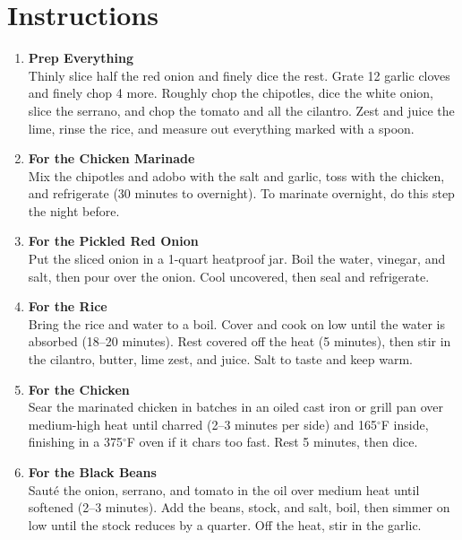 \newpage

\section*{Instructions}

\begin{enumerate}

    \item \textbf{Prep Everything} \\
          Thinly slice half the red onion and finely dice the rest. Grate 12 garlic cloves and finely chop 4 more. Roughly chop the chipotles, dice the white onion, slice the serrano, and chop the tomato and all the cilantro. Zest and juice the lime, rinse the rice, and measure out everything marked with a spoon.

    \item \textbf{For the Chicken Marinade} \\
          Mix the chipotles and adobo with the salt and garlic, toss with the chicken, and refrigerate (30 minutes to overnight). To marinate overnight, do this step the night before.

    \item \textbf{For the Pickled Red Onion} \\
          Put the sliced onion in a 1-quart heatproof jar. Boil the water, vinegar, and salt, then pour over the onion. Cool uncovered, then seal and refrigerate.

    \item \textbf{For the Rice} \\
          Bring the rice and water to a boil. Cover and cook on low until the water is absorbed (18--20 minutes). Rest covered off the heat (5 minutes), then stir in the cilantro, butter, lime zest, and juice. Salt to taste and keep warm.

    \item \textbf{For the Chicken} \\
          Sear the marinated chicken in batches in an oiled cast iron or grill pan over medium-high heat until charred (2--3 minutes per side) and 165$^\circ$F inside, finishing in a 375$^\circ$F oven if it chars too fast. Rest 5 minutes, then dice.

    \item \textbf{For the Black Beans} \\
          Sauté the onion, serrano, and tomato in the oil over medium heat until softened (2--3 minutes). Add the beans, stock, and salt, boil, then simmer on low until the stock reduces by a quarter. Off the heat, stir in the garlic.


\end{enumerate}
